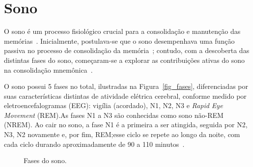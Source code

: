 \section{Sono}

O sono é um processo fisiológico crucial para a consolidação e manutenção das memórias~\cite{blissittSleep2001, walkerSleep2006,
diekelmannMemory2010}. Inicialmente, postulava-se que o sono desempenhava uma função passiva no processo de consolidação da
memória~\cite{jenkinsObliviscence1924}; contudo, com a descoberta das distintas fases do sono, começaram-se a explorar as
contribuições ativas do sono na consolidação mnemônica~\cite{aserinskyRegularly1953}.

O sono possui 5 fases no total, ilustradas na Figura~\ref{fig_fases}, diferenciadas por suas características distintas de
atividade elétrica cerebral, conforme medido por eletroencefalogramas (EEG)\cite{silberVisual2007}: vigília (acordado), N1, N2, N3
e \textit{Rapid Eye Movement} (REM).\@ As fases N1 a N3 são conhecidas como sono não-REM (NREM). Ao cair no sono, a fase N1 é a
primeira a ser atingida, seguida por N2, N3, N2 novamente e, por fim, REM;\@ esse ciclo se repete ao longo da noite, com cada
ciclo durando aproximadamente de 90 a 110 minutos~\cite{k.patelPhysiology2022}.

\begin{figure}[!ht]
\caption{Fases do sono.}
\end{figure}


